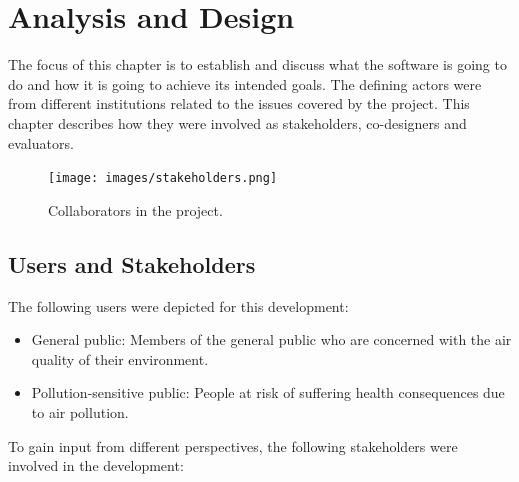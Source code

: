 \chapter{Analysis and Design}
The focus of this chapter is to establish and discuss what the software is going to do and how it is going to achieve its intended goals. The defining actors were from different institutions related to the issues covered by the project. This chapter describes how they were involved as stakeholders, co-designers and evaluators. 

\begin{figure}[h]
\begin{adjustbox}{width=1\textwidth,center=\textwidth}
  \centering
  \texttt{[image: images/stakeholders.png]}
\end{adjustbox}
  \caption[Colaborators in the project]{Collaborators in the project.}
  \label{fig:stakeholders}
\end{figure}

\section{Users and Stakeholders}

The following users were depicted for this development:

\begin{itemize}
    \item General public: Members of the general public who are concerned with the air quality of their environment.
    \item Pollution-sensitive public: People at risk of suffering health consequences due to air pollution.
\end{itemize}

To gain input from different perspectives, the following stakeholders were involved in the development: 

